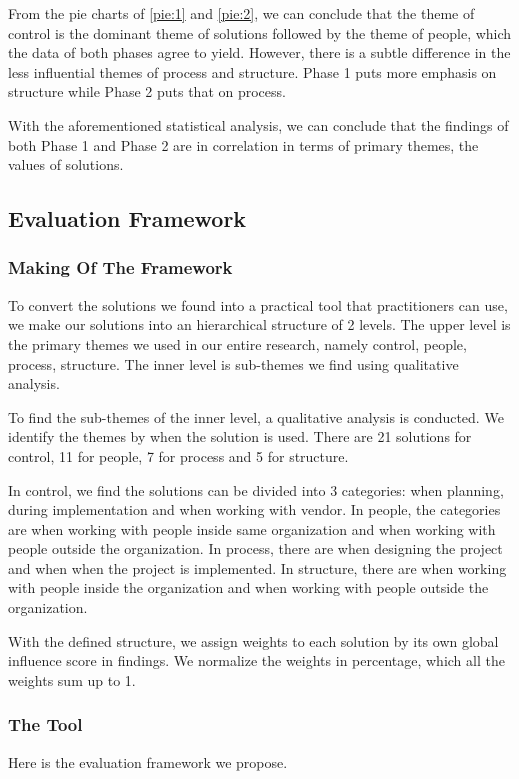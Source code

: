 From the pie charts of \ref{pie:1} and \ref{pie:2}, we can conclude that the theme of control is the dominant theme of solutions followed by the theme of people, which the data of both phases agree to yield. However, there is a subtle difference in the less influential themes of process and structure. Phase 1 puts more emphasis on structure while Phase 2 puts that on process.

With the aforementioned statistical analysis, we can conclude that the findings of both Phase 1 and Phase 2 are in correlation in terms of primary themes, the values of solutions.

\subsection{Evaluation Framework}

\subsubsection{Making Of The Framework}
To convert the solutions we found into a practical tool that practitioners can use, we make our solutions into an hierarchical structure of 2 levels. The upper level is the primary themes we used in our entire research, namely control, people, process, structure. The inner level is sub-themes we find using qualitative analysis.

To find the sub-themes of the inner level, a qualitative analysis is conducted. We identify the themes by when the solution is used. There are 21 solutions for control, 11 for people, 7 for process and 5 for structure.

In control, we find the solutions can be divided into 3 categories: when planning, during implementation and when working with vendor. In people, the categories are when working with people inside same organization and when working with people outside the organization. In process, there are when designing the project and when when the project is implemented. In structure, there are when working with people inside the organization and when working with people outside the organization.

With the defined structure, we assign weights to each solution by its own global influence score in findings. We normalize the weights in percentage, which all the weights sum up to 1.

\subsubsection{The Tool}

Here is the evaluation framework we propose.

\begin{figure}[ht]
\centering
{}
\end{figure}